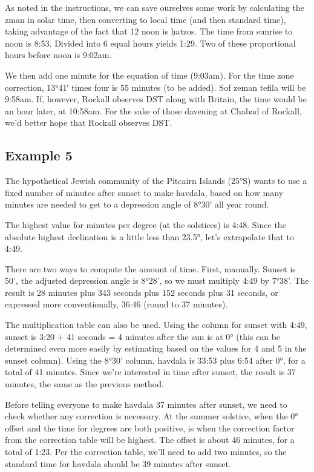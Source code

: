 As noted in the instructions, we can save ourselves some work by calculating the zman in solar time, then converting to local time (and then standard time), taking advantage of the fact that 12 noon is \d{h}atzos.  The time from sunrise to noon is 8:53.  Divided into 6 equal hours yields 1:29.  Two of these proportional hours before noon is 9:02am.

We then add one minute for the equation of time (9:03am).  For the time zone correction, 13°41′ times four is 55 minutes (to be added).  Sof zeman tefila will be 9:58am.  If, however, Rockall observes DST along with Britain, the time would be an hour later, at 10:58am.  For the sake of those davening at Chabad of Rockall, we'd better hope that Rockall observes DST.

\subsection{Example 5}

The hypothetical Jewish community of the Pitcairn Islands (25°S) wants to use a fixed number of minutes after sunset to make havdala, based on how many minutes are needed to get to a depression angle of 8°30' all year round.

The highest value for minutes per degree (at the solstices) is 4:48. Since the absolute highest declination is a little less than 23.5°, let's extrapolate that to 4:49.  

There are two ways to compute the amount of time. First, manually.  Sunset is 50', the adjusted depression angle is 8°28', so we must multiply 4:49 by 7°38'. The result is 28 minutes plus 343 seconds plus 152 seconds plus 31 seconds, or expressed more conventionally, 36:46 (round to 37 minutes).

The multiplication table can also be used.  Using the column for sunset with 4:49, sunset is 3:20 + 41 seconds = 4 minutes after the sun is at 0° (this can be determined even more easily by estimating based on the values for 4 and 5 in the sunset column). Using the 8°30' column, havdala is 33:53 plus 6:54 after 0°, for a total of 41 minutes. Since we're interested in time after sunset, the result is 37 minutes, the same as the previous method.

Before telling everyone to make havdala 37 minutes after sunset, we need to check whether any correction is necessary.  At the summer solstice, when the 0° offset and the time for degrees are both positive, is when the correction factor from the correction table will be highest.  The offset is about 46 minutes, for a total of 1:23. Per the correction table, we'll need to add two minutes, so the standard time for havdala should be 39 minutes after sunset.